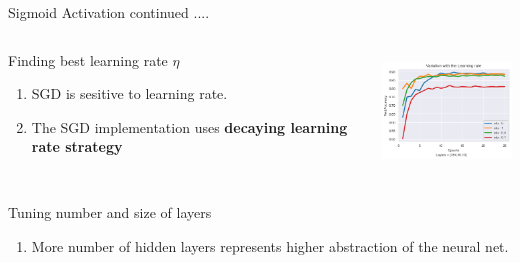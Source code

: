 \documentclass[12pt,t]{beamer}
\begin{document}
\begin{frame}[t]
    \large Sigmoid Activation continued ....
    
    \scriptsize

    \begin{columns}
        \begin{column}[T]{0.4\linewidth}
            \begin{block}{Finding best learning rate $\eta$}
                \scriptsize
                \begin{enumerate}
                    \item SGD is sesitive to learning rate.
                    \item The SGD implementation uses \textbf{decaying learning rate strategy}
                \end{enumerate}
            \end{block}
        \end{column}
        \begin{column}[T]{0.6\linewidth}
            \includegraphics[width=\linewidth,height=90pt]{sigmoid/eta_variation.png}
        \end{column}
    \end{columns}

    \begin{columns}
        \begin{column}[T]{0.4\linewidth}
            \scriptsize
            \begin{block}{Tuning number and size of layers}
                \begin{enumerate}
                    \item More number of hidden layers represents higher abstraction of the neural net.
                

\end{enumerate}
\end{block}
\end{column}
\end{columns}
\end{frame}
\end{document}
